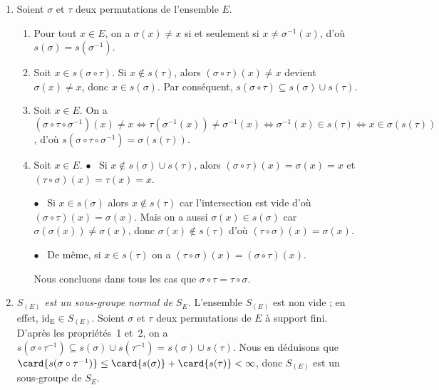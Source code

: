 \begin{enumerate}
  \item %
    Soient $\sigma$ et $\tau$ deux permutations de l'ensemble $E$.
    \begin{enumerate}[1)]
      \item %
        Pour tout $x\in E$, on a $\sigma(x)\neq x$ si et seulement si $x\neq \sigma^{-1}(x)$, d'où $s(\sigma) = s(\sigma^{-1})$.

      \item %
        Soit $x\in s(\sigma\circ\tau)$. Si $x\notin s(\tau)$, alors $(\sigma\circ\tau)(x) \neq x$ devient $\sigma(x)\neq x$, donc $x\in s(\sigma)$. 
        Par conséquent, $s(\sigma\circ\tau)\subseteq s(\sigma)\cup s(\tau)$.

      \item %
        Soit $x\in E$.
        On a $(\sigma\circ\tau\circ\sigma^{-1})(x) \neq x \iff \tau(\sigma^{-1}(x)) \neq \sigma^{-1}(x) \iff \sigma^{-1}(x) \in s(\tau) \iff x \in \sigma(s(\tau))$, d'où $s(\sigma\circ\tau\circ\sigma^{-1}) = \sigma(s(\tau))$.

      \item %
        Soit $x\in E$. 
        $\bullet$~ Si $x\notin s(\sigma)\cup s(\tau)$, alors $(\sigma\circ\tau)(x) = \sigma(x) = x$ et $(\tau\circ\sigma)(x) = \tau(x) = x$.

        $\bullet$~ Si $x\in s(\sigma)$ alors $x\notin s(\tau)$ car l'intersection est vide d'où $(\sigma\circ\tau)(x) = \sigma(x)$.
        Mais on a aussi $\sigma(x)\in s(\sigma)$ car $\sigma(\sigma(x)) \neq \sigma(x)$, donc $\sigma(x)\notin s(\tau)$ d'où $(\tau\circ\sigma)(x) = \sigma(x)$.

        $\bullet$~ De même, si $x\in s(\tau)$ on a $(\tau\circ\sigma)(x) = (\sigma\circ\tau)(x)$.

        Nous concluons dans tous les cas que $\sigma\circ\tau = \tau\circ\sigma$.
    \end{enumerate}

  \item %
    \emph{$S_{(E)}$ est un sous-groupe normal de $S_E$.}
    L'ensemble $S_{(E)}$ est non vide ; en effet, $\mathrm{id_E}\in S_{(E)}$.
    Soient $\sigma$ et $\tau$ deux permutations de $E$ à support fini.
    D'après les propriétés~1 et~2, on a $s(\sigma\circ\tau^{-1})\subseteq s(\sigma)\cup s(\tau^{-1})=s(\sigma)\cup s(\tau)$. 
    Nous en déduisons que $\card{s(\sigma\circ\tau^{-1})}\leq \card{s(\sigma)} + \card{s(\tau)} < \infty$, donc $S_{(E)}$ est un sous-groupe de $S_E$.  
    

\end{enumerate}
